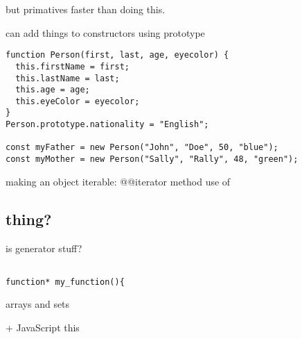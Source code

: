 but primatives faster than doing this.

can add things to constructors using prototype

\begin{verbatim}
function Person(first, last, age, eyecolor) {
  this.firstName = first;
  this.lastName = last;
  this.age = age;
  this.eyeColor = eyecolor;
}
Person.prototype.nationality = "English";

const myFather = new Person("John", "Doe", 50, "blue");
const myMother = new Person("Sally", "Rally", 48, "green");
\end{verbatim}

making an object iterable: @@iterator method
use of 

\subsection{thing?}
is generator stuff?
\begin{verbatim}

function* my_function(){
\end{verbatim}

arrays and sets


+ JavaScript this
